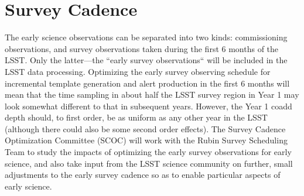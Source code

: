\section{Survey Cadence}


The early science observations can be separated into two kinds: commissioning observations, and survey observations taken during the first 6 months of the LSST.
Only the latter---the ``early survey observations`` will be included in the LSST data processing.
Optimizing the early survey observing schedule for incremental template generation and alert production in the first 6 months will mean that the time sampling in about half the LSST survey region in Year 1 may look somewhat different to that in subsequent years.
However, the Year 1 coadd depth should, to first order, be as uniform as any other year in the LSST (although there could also be some second order effects).
The Survey Cadence Optimization Committee (SCOC) will work with the Rubin Survey Scheduling Team to study the impacts of optimizing the early survey observations for early science, and also take input from the LSST science community on further, small adjustments to the early survey cadence so as to enable particular aspects of early science.
